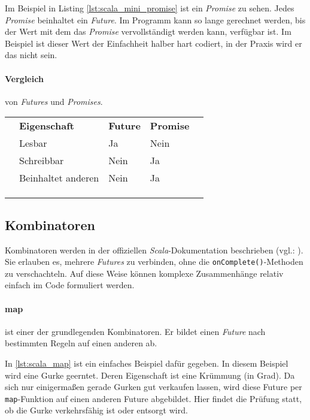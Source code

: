 Im Beispiel in Listing \ref{lst:scala_mini_promise} ist ein \emph{Promise} zu sehen.
Jedes \emph{Promise} beinhaltet ein \emph{Future}. Im Programm kann
so lange gerechnet werden, bis der Wert mit dem das \emph{Promise}
vervollständigt werden kann, verfügbar ist. Im Beispiel ist dieser
Wert der Einfachheit halber hart codiert, in der Praxis wird er das
nicht sein.

\paragraph{Vergleich} von \emph{Futures} und \emph{Promises}.

\begin{table}[h]
\begin{tabular}{lllll}
 & \textbf{Eigenschaft} & \textbf{Future} & \textbf{Promise} &  \\
 & Lesbar & Ja & Nein &  \\
 & Schreibbar & Nein & Ja &  \\
 & Beinhaltet anderen & Nein & Ja &  \\
 &  &  &  &  \\
 &  &  &  &  \\
 &  &  &  & 
\end{tabular}
\end{table}

\subsection{Kombinatoren}

Kombinatoren werden in der offiziellen \emph{Scala}-Dokumentation beschrieben (vgl.: \cite{scalaDokuFP}).
Sie erlauben es, mehrere \emph{Futures} zu verbinden, ohne die \texttt{onComplete()}-Methoden
zu verschachteln. Auf diese Weise können komplexe Zusammenhänge relativ einfach
im Code formuliert werden.

\paragraph{map} ist einer der grundlegenden Kombinatoren. Er bildet
einen \emph{Future} nach bestimmten Regeln auf einen anderen ab.

In \ref{lst:scala_map} ist ein einfaches Beispiel dafür gegeben.
In diesem Beispiel wird eine Gurke geerntet. Deren Eigenschaft ist eine
Krümmung (in Grad). Da sich nur einigermaßen gerade
Gurken gut verkaufen lassen, wird diese Future per \texttt{map}-Funktion
auf einen anderen Future abgebildet. Hier findet die Prüfung statt, ob
die Gurke verkehrsfähig ist oder entsorgt wird.

